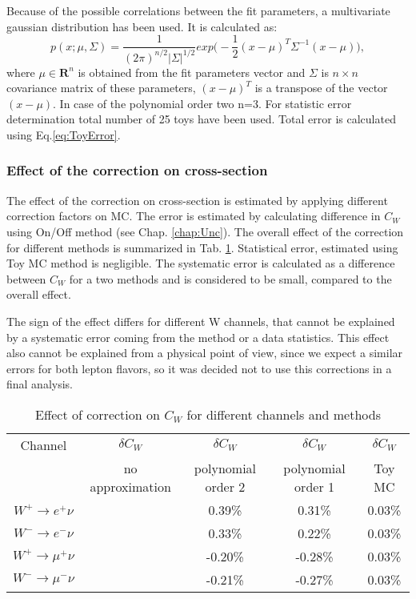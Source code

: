 Because of the possible correlations between the fit parameters, a multivariate gaussian distribution has been used. It  is calculated as:
\begin{equation}
p(x;\mu, \Sigma) =\frac{1}{(2\pi)^{n/2}|\Sigma|^{1/2}} exp\Big(-\frac{1}{2}(x-\mu)^{T}\Sigma^{-1}(x-\mu)\Big),
\end{equation}
where $\mu\in \boldsymbol{R}^{n}$ is obtained from the fit parameters vector and $\Sigma$ is $n \times n$ covariance matrix of these parameters, $(x-\mu)^{T}$ is a transpose of the vector $(x-\mu)$. In case of the polynomial order two n=3. For statistic error determination total number of 25 toys have been used. Total error is calculated using Eq.\ref{eq:ToyError}.

\subsubsection{Effect of the \sumet correction on cross-section}
The effect of the \sumet correction on cross-section is estimated by applying different correction factors on MC. The error is estimated by calculating difference in $C_{W}$ using On/Off method (see Chap. \ref{chap:Unc}). The overall effect of the \sumet correction for different methods is summarized in Tab. \ref{SumetCW}. Statistical error, estimated using Toy MC method is negligible. The systematic error is calculated as a difference between $C_{W}$ for a two methods and is considered to be small, compared to the overall effect. 

The sign of the effect differs for different W channels, that cannot be explained by a systematic error coming from the method or a data statistics. This effect also cannot be explained from a physical point of view, since we expect a similar errors for both lepton flavors, so it was decided not to use this corrections in a final analysis.

 \begin{table}[!t]
 \caption{Effect of \sumet correction on $C_{W}$ for different channels and methods}
\label{SumetCW}
\begin{center}
\begin{tabular}{c | c | c |  c |  c   }
\hline
Channel & $\delta C_W$ & $\delta C_W$ & $\delta C_W$ & $\delta C_W$ \\
& no approximation & polynomial order 2 & polynomial order 1 & Toy MC \\
\hline
\hline
$W^{+} \to e^{+}\nu$ & &0.39\%  & 0.31\% & 0.03\% \\
$W^{-} \to e^{-}\nu$ & &0.33\%  & 0.22\% & 0.03\% \\
$W^{+} \to \mu^{+}\nu$ & &-0.20\%  & -0.28\% & 0.03\% \\
$W^{-} \to \mu^{-}\nu$ & &-0.21\%  & -0.27\% & 0.03\% \\
\hline
\end{tabular}
\end{center}

\end{table}


